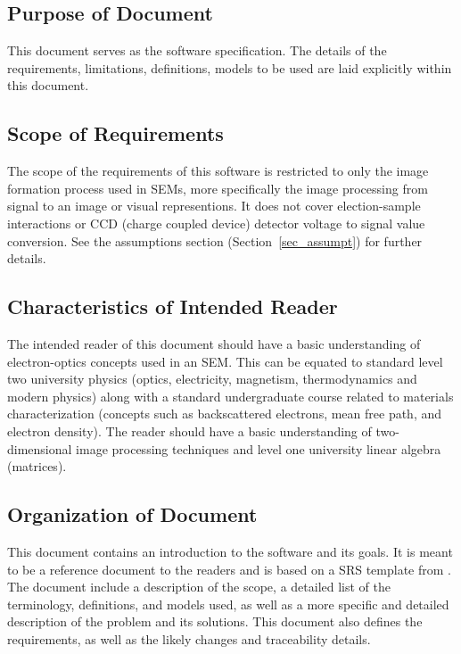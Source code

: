 \documentclass[12pt]{article}
\begin{document}
\subsection{Purpose of Document}

This document serves as the software specification. The details of the 
requirements, limitations, definitions, models to be used are laid explicitly 
within this document.

\subsection{Scope of Requirements} 

The scope of the requirements of this software is restricted to only the image 
formation process used in SEMs, more specifically the image processing from 
signal to an image or visual representions. It does not cover election-sample 
interactions or CCD (charge coupled device) detector voltage to signal value 
conversion. See the assumptions section (Section~\ref{sec_assumpt}) for further 
details.

\subsection{Characteristics of Intended Reader} \label{sec_IntendedReader}

The intended reader of this document should have a basic understanding of 
electron-optics concepts used in an SEM. This can be equated to standard level 
two university physics (optics, electricity, magnetism, thermodynamics and 
modern physics) along with a standard undergraduate course related to materials 
characterization (concepts such as backscattered electrons, mean free path, and 
electron density). The reader should have a basic understanding of two-dimensional 
image processing techniques and level one university linear algebra (matrices).

\subsection{Organization of Document}

This document contains an introduction to the software and its goals. It is 
meant to be a reference document to the readers and is based on a SRS template from \citet{SmithAndLai2005, SmithEtAl2007}. The document include a 
description of the scope, a detailed list of the terminology, definitions, and 
models used, as well as a more specific and detailed description of the problem 
and its solutions. This document also defines the requirements, as well as the  
likely changes and traceability details.
\end{document}
